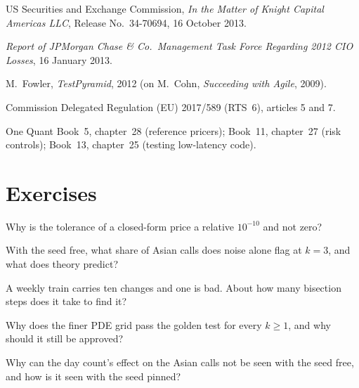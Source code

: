 \begin{omsources}
\item US Securities and Exchange Commission, \emph{In the Matter of Knight Capital Americas LLC}, Release No.~34-70694, 16 October 2013.
\item \emph{Report of JPMorgan Chase \& Co.\ Management Task Force Regarding 2012 CIO Losses}, 16 January 2013.
\item M.~Fowler, \emph{TestPyramid}, 2012 (on M.~Cohn, \emph{Succeeding with Agile}, 2009).
\item Commission Delegated Regulation (EU) 2017/589 (RTS~6), articles 5 and 7.
\item One Quant Book~5, chapter~28 (reference pricers); Book~11, chapter~27 (risk controls); Book~13, chapter~25 (testing low-latency code).
\end{omsources}

\section{Exercises}

\begin{exercise}[$\star$]\label{exo:pl:testing-and-continuous-delivery:1}
Why is the tolerance of a closed-form price a relative $10^{-10}$ and not zero?
\end{exercise}

\begin{exercise}[$\star$]\label{exo:pl:testing-and-continuous-delivery:2}
With the seed free, what share of Asian calls does noise alone flag at $k=3$, and what does theory predict?
\end{exercise}

\begin{exercise}[$\star$]\label{exo:pl:testing-and-continuous-delivery:3}
A weekly train carries ten changes and one is bad. About how many bisection steps does it take to find it?
\end{exercise}

\begin{exercise}[$\star\star$]\label{exo:pl:testing-and-continuous-delivery:4}
Why does the finer PDE grid pass the golden test for every $k\ge1$, and why should it still be approved?
\end{exercise}

\begin{exercise}[$\star\star$]\label{exo:pl:testing-and-continuous-delivery:5}
Why can the day count's effect on the Asian calls not be seen with the seed free, and how is it seen with the seed pinned?
\end{exercise}

